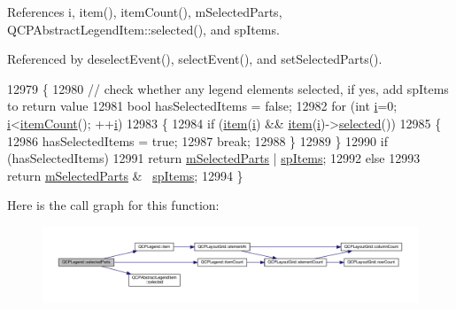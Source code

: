 References i, item(), item\+Count(), m\+Selected\+Parts, Q\+C\+P\+Abstract\+Legend\+Item\+::selected(), and sp\+Items.



Referenced by deselect\+Event(), select\+Event(), and set\+Selected\+Parts().


\begin{DoxyCode}
12979 \{
12980   \textcolor{comment}{// check whether any legend elements selected, if yes, add spItems to return value}
12981   \textcolor{keywordtype}{bool} hasSelectedItems = \textcolor{keyword}{false};
12982   \textcolor{keywordflow}{for} (\textcolor{keywordtype}{int} \hyperlink{_comparision_pictures_2_createtest_image_8m_a6f6ccfcf58b31cb6412107d9d5281426}{i}=0; \hyperlink{_comparision_pictures_2_createtest_image_8m_a6f6ccfcf58b31cb6412107d9d5281426}{i}<\hyperlink{class_q_c_p_legend_a198228e9cdc78d3a3c306fa6763d0404}{itemCount}(); ++\hyperlink{_comparision_pictures_2_createtest_image_8m_a6f6ccfcf58b31cb6412107d9d5281426}{i})
12983   \{
12984     \textcolor{keywordflow}{if} (\hyperlink{class_q_c_p_legend_a454272d7094437beb3278a2294006da5}{item}(\hyperlink{_comparision_pictures_2_createtest_image_8m_a6f6ccfcf58b31cb6412107d9d5281426}{i}) && \hyperlink{class_q_c_p_legend_a454272d7094437beb3278a2294006da5}{item}(\hyperlink{_comparision_pictures_2_createtest_image_8m_a6f6ccfcf58b31cb6412107d9d5281426}{i})->\hyperlink{class_q_c_p_abstract_legend_item_ac776e68e3367704452131c6aa9908bb9}{selected}())
12985     \{
12986       hasSelectedItems = \textcolor{keyword}{true};
12987       \textcolor{keywordflow}{break};
12988     \}
12989   \}
12990   \textcolor{keywordflow}{if} (hasSelectedItems)
12991     \textcolor{keywordflow}{return} \hyperlink{class_q_c_p_legend_a917a34dd2856baafd8d56852d94d00e2}{mSelectedParts} | \hyperlink{class_q_c_p_legend_a5404de8bc1e4a994ca4ae69e2c7072f1a768bfb95f323db4c66473375032c0af7}{spItems};
12992   \textcolor{keywordflow}{else}
12993     \textcolor{keywordflow}{return} \hyperlink{class_q_c_p_legend_a917a34dd2856baafd8d56852d94d00e2}{mSelectedParts} & ~\hyperlink{class_q_c_p_legend_a5404de8bc1e4a994ca4ae69e2c7072f1a768bfb95f323db4c66473375032c0af7}{spItems};
12994 \}
\end{DoxyCode}


Here is the call graph for this function\+:\nopagebreak
\begin{figure}[H]
\begin{center}
\leavevmode
\includegraphics[width=350pt]{class_q_c_p_legend_abbbf1b2d6a149013527ed87b0780894a_cgraph}
\end{center}
\end{figure}




